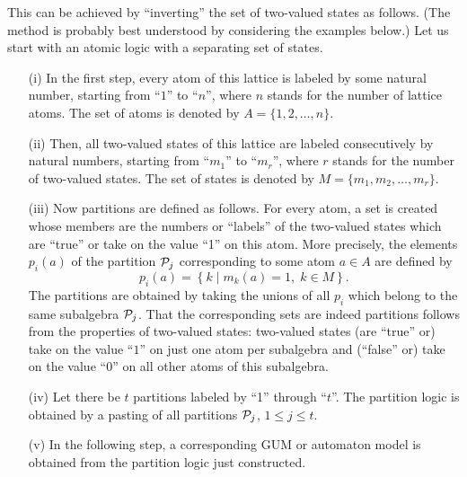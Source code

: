 This can be achieved by ``inverting'' the set of two-valued states as follows.
(The method is probably best understood by considering the examples below.)
Let us start with an atomic logic with a separating set of states.
\begin{itemize}
\item[(i)]
In the first step, every atom of this lattice is labeled by some natural number,
starting from ``$1$'' to ``$n$'', where $n$  stands for the number of lattice atoms.
The set of atoms is denoted by $A=\{1,2,\ldots , n\}$.

\item[(ii)]
Then, all two-valued states of this lattice are labeled consecutively
by natural numbers, starting from ``$m_1$'' to ``$m_r$'', where $r$  stands for the number of
two-valued states.
The set of states is denoted by $M=\{m_1,m_2,\ldots , m_r\}$.

\item[(iii)]
Now  partitions are defined as follows.
For every atom, a set is created whose members are the numbers or ``labels'' of
the two-valued states which are ``true'' or take on the value ``1'' on this atom.
More precisely,
the elements $p_i(a)$ of the partition ${\cal P}_j$ corresponding to
some atom $a\in A$ are defined by
$$p_i (a) =
\left\{
k \mid m_k(a)=1, \; k\in M
\right\}
.
$$
The partitions are obtained by taking the unions of all $p_i$ which belong to the same
subalgebra ${\cal P}_j$.
That the corresponding sets are indeed partitions follows from the properties of
two-valued states: two-valued states (are ``true'' or) take on the value ``$1$'' on just one atom
per subalgebra and (``false'' or) take on the value ``$0$'' on all other atoms of this subalgebra.

\item[(iv)]
Let there be $t$ partitions labeled by ``1'' through ``$t$''.
The partition logic is obtained by a pasting of all partitions
${\cal P}_j$, $1\le j \le t$.


\item[(v)] In the following step, a corresponding GUM or automaton model is
obtained from the partition logic just constructed.


\end{itemize}
